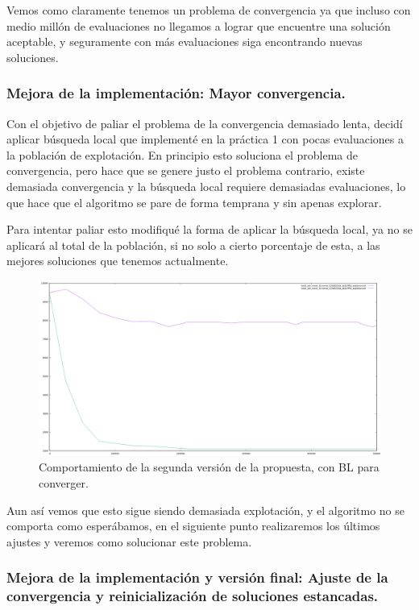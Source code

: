 \documentclass[12pt, spanish]{article}
\begin{document}
Vemos como claramente tenemos un problema de convergencia ya que incluso con medio millón de evaluaciones no llegamos a lograr que encuentre una solución aceptable, y seguramente con más evaluaciones siga encontrando nuevas soluciones.


\subsubsection{Mejora de la implementación: Mayor convergencia.}

Con el objetivo de paliar el problema de la convergencia demasiado lenta, decidí aplicar búsqueda local que implementé en la práctica 1 con pocas evaluaciones a la población de explotación. En principio esto soluciona el problema de convergencia, pero hace que se genere justo el problema contrario, existe demasiada convergencia y la búsqueda local requiere demasiadas evaluaciones, lo que hace que el algoritmo se pare de forma temprana y sin apenas explorar.

Para intentar paliar esto modifiqué la forma de aplicar la búsqueda local, ya no se aplicará al total de la población, si no solo a cierto porcentaje de esta, a las mejores soluciones que tenemos actualmente.


\begin{figure}[H]
	\centering
	\includegraphics[scale = 0.33]{con_BL_explotar.png}
	
	\caption{Comportamiento de la segunda versión de la propuesta, con BL para converger.}
	\label{fig:basico_BL}
\end{figure}

Aun así vemos que esto sigue siendo demasiada explotación, y el algoritmo no se comporta como esperábamos, en el siguiente punto realizaremos los últimos ajustes y veremos como solucionar este problema.


\subsubsection{Mejora de la implementación y versión final: Ajuste de la convergencia y reinicialización de soluciones estancadas.}
\end{document}
